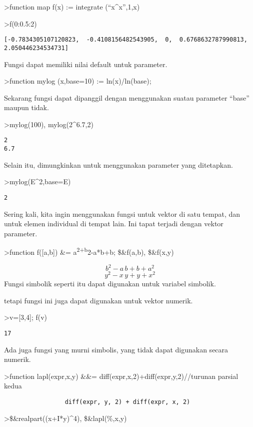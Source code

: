\documentclass[
]{book}
\begin{document}
\textgreater function map f(x) := integrate (``x\^{}x'',1,x)

\textgreater f(0:0.5:2)

\begin{verbatim}
[-0.7834305107120823,  -0.4108156482543905,  0,  0.6768632787990813,
2.050446234534731]
\end{verbatim}

Fungsi dapat memiliki nilai default untuk parameter.

\textgreater function mylog (x,base=10) := ln(x)/ln(base);

Sekarang fungsi dapat dipanggil dengan menggunakan suatau parameter ``base'' maupun tidak.

\textgreater mylog(100), mylog(2\^{}6.7,2)

\begin{verbatim}
2
6.7
\end{verbatim}

Selain itu, dimungkinkan untuk menggunakan parameter yang ditetapkan.

\textgreater mylog(E\^{}2,base=E)

\begin{verbatim}
2
\end{verbatim}

Sering kali, kita ingin menggunakan fungsi untuk vektor di satu tempat, dan untuk elemen individual di tempat lain. Ini tapat terjadi dengan vektor parameter.

\textgreater function f({[}a,b{]}) \&= a\textsuperscript{2+b}2-a*b+b; \$\&f(a,b), \$\&f(x,y)

\[b^2-a\,b+b+a^2\]\[y^2-x\,y+y+x^2\]Fungsi simbolik seperti itu dapat digunakan untuk variabel simbolik.

tetapi fungsi ini juga dapat digunakan untuk vektor numerik.

\textgreater v={[}3,4{]}; f(v)

\begin{verbatim}
17
\end{verbatim}

Ada juga fungsi yang murni simbolis, yang tidak dapat digunakan secara numerik.

\textgreater function lapl(expr,x,y) \&\&= diff(expr,x,2)+diff(expr,y,2)//turunan parsial kedua

\begin{verbatim}
                 diff(expr, y, 2) + diff(expr, x, 2)
\end{verbatim}

\textgreater\$\&realpart((x+I*y)\^{}4), \$\&lapl(\%,x,y)
\end{document}
